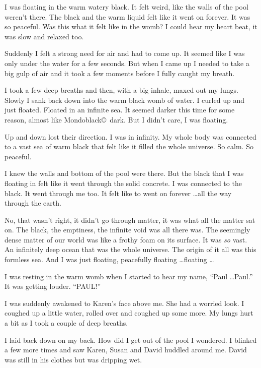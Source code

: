I was floating in the warm watery black. It felt weird, like the
walls of the pool weren't there. The black and the warm liquid
felt like it went on forever. It was so peaceful. Was this what
it felt like in the womb? I could hear my heart beat, it was
slow and relaxed too.

Suddenly I felt a strong need for air and had to come up. It
seemed like I was only under the water for a few seconds. But
when I came up I needed to take a big gulp of air and it took a
few moments before I fully caught my breath.

I took a few deep breaths and then, with a big inhale,
maxed out my lungs. Slowly I sank back down into the warm
black womb of water. I curled up and just floated. Floated in an
infinite sea. It seemed darker this time for some reason, almost
like Mondoblack\copyright\ dark. But I didn't care, I was
floating.

Up and down lost their direction. I was in infinity. My whole
body was connected to a vast sea of warm black that felt like it
filled the whole universe. So calm. So peaceful.

I knew the walls and bottom of the pool were there. But the
black that I was floating in felt like it went through the solid
concrete. I was connected to the black. It went through me too.
It felt like to went on forever \ldots all the way through the
earth.

No, that wasn't right, it didn't go through matter, it was what
all the matter sat on. The black, the emptiness, the infinite
void was all there was. The seemingly dense matter of our world
was like a frothy foam on its surface. It was \emph{so} vast. An
infinitely deep ocean that was the whole universe. The origin of
it all was this formless sea. And I was just floating,
peacefully floating \ldots floating \ldots

I was resting in the warm womb when I started to hear my name,
``Paul \ldots Paul.'' It was getting louder. ``PAUL!''

I was suddenly awakened to Karen's face above me. She had a
worried look. I coughed up a little water, rolled over and
coughed up some more. My lungs hurt a bit as I took a couple of
deep breaths.

I laid back down on my back. How did I get out of the pool I
wondered. I blinked a few more times and saw Karen, Susan and
David huddled around me. David was still in his clothes but was
dripping wet.

